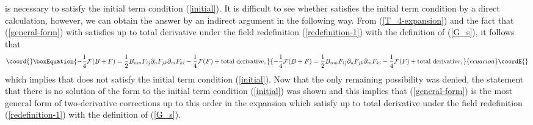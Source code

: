 \documentclass[a4paper,12pt]{article}
\begin{document}
is necessary
to satisfy the initial term condition (\ref{initial}).
It is difficult to see whether
\coordHE{} satisfies the initial term condition
by a direct calculation, however, we can obtain the answer
by an indirect argument in the following way. From
(\ref{T_4-expansion}) and the fact that
(\ref{general-form}) with \coordHE{} satisfies
\coordHE{}
up to total derivative under the field redefinition
(\ref{redefinition-1}) with the definition of \coordHE{} (\ref{G_s}),
it follows that
\begin{equation}\coord{}\boxEquation{
-\frac{1}{4} {\cal F} (B+F) =
\frac{1}{2} B_{nm}
F_{ij} \partial_n F_{jk} \partial_m F_{ki}
-\frac{1}{4} {\cal F} (F)
+ {\rm total~derivative},
}{
-\frac{1}{4} {\cal F} (B+F) =
\frac{1}{2} B_{nm}
F_{ij} \partial_n F_{jk} \partial_m F_{ki}
-\frac{1}{4} {\cal F} (F)
+ {\rm total~derivative},
}{ecuacion}\coordE{}\end{equation}
which implies that \coordHE{} does not satisfy
the initial term condition (\ref{initial}).
Now that the only remaining possibility was denied,
the statement that
there is no solution of the form \coordHE{}
to the initial term condition (\ref{initial})
was shown and this implies
that (\ref{general-form}) is the most general form
of two-derivative corrections
up to this order in the \coordHE{} expansion
which satisfy
\coordHE{}
up to total derivative under the field redefinition
(\ref{redefinition-1}) with the definition of \coordHE{} (\ref{G_s}).
\end{document}
